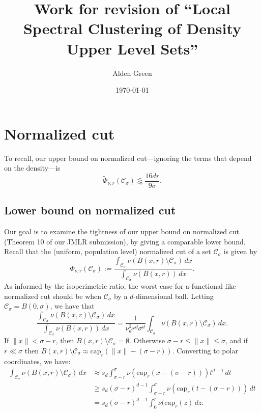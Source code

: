 \documentclass{report}
\newcommand{\1}{\mathbf{1}}
\newcommand{\mc}[1]{\mathcal{#1}}
\newcommand{\wt}[1]{\widetilde{#1}}
\theoremstyle{alden}
\theoremstyle{aldenthm}
\theoremstyle{definition}
\theoremstyle{remark}
\begin{document}
\title{Work for revision of ``Local Spectral Clustering of Density Upper Level Sets''}
\author{Alden Green}
\date{\today}
\maketitle

\chapter{Normalized cut}
To recall, our upper bound on normalized cut---ignoring the terms that depend on the density---is 
\begin{equation*}
\wt{\Phi}_{\nu,r}(\mc{C}_{\sigma}) \lessapprox \frac{16dr}{9\sigma}.
\end{equation*}
\section{Lower bound on normalized cut}
Our goal is to examine the tightness of our upper bound on normalized cut (Theorem 10 of our JMLR submission), by giving a comparable lower bound. Recall that the (uniform, population level) normalized cut of a set $\mc{C}_{\sigma}$ is given by
\begin{equation*}
\Phi_{\nu,r}(\mc{C}_{\sigma}) := \frac{\int_{\mc{C}_{\sigma}} \nu(B(x,r) \setminus \mc{C}_{\sigma}) \,dx}{\int_{\mc{C}_{\sigma}} \nu(B(x,r)) \,dx}.
\end{equation*}
As informed by the isoperimetric ratio, the worst-case for a functional like normalized cut should be when $\mc{C}_{\sigma}$ by a $d$-dimensional ball. Letting $\mc{C}_{\sigma} = B(0,\sigma)$, we have that
\begin{equation*}
\frac{\int_{\mc{C}_{\sigma}} \nu(B(x,r) \setminus \mc{C}_{\sigma}) \,dx}{\int_{\mc{C}_{\sigma}} \nu(B(x,r)) \,dx} = \frac{1}{\nu_d^2 r^d \sigma^d} \int_{\mc{C}_{\sigma}} \nu(B(x,r) \setminus \mc{C}_{\sigma}) \,dx.
\end{equation*}
If $\|x\| < \sigma - r$, then $B(x,r) \setminus \mc{C}_{\sigma} = \emptyset$. Otherwise $\sigma - r \leq \|x\| \leq \sigma$, and if $r \ll \sigma$ then $B(x,r) \setminus \mc{C}_{\sigma} \approx \mathrm{cap}_{r}(\|x\| - (\sigma - r))$. Converting to polar coordinates, we have:
\begin{align*}
\int_{\mc{C}_{\sigma}} \nu(B(x,r) \setminus \mc{C}_{\sigma}) \,dx & \approx s_d \int_{\sigma - r}^{\sigma} \nu(\mathrm{cap}_{r}(x - (\sigma - r))) t^{d - 1} \,dt \\
& \geq s_d (\sigma - r)^{d - 1} \int_{\sigma - r}^{\sigma} \nu(\mathrm{cap}_{r}(t - (\sigma - r)))  \,dt \\
& = s_d (\sigma - r)^{d - 1} \int_{0}^{r} \nu(\mathrm{cap}_{r}(z)  \,dz.
\end{align*}
\end{document}
